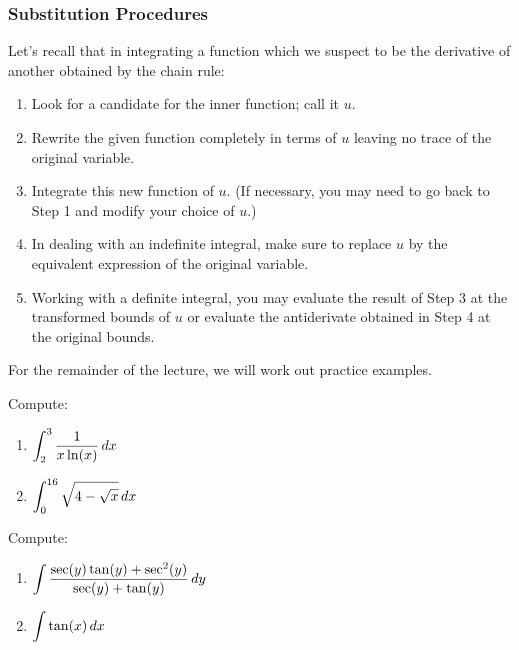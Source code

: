 \documentclass[10pt,t,handout,ignorenonframetext,aspectratio=169]{beamer}
\title[\course]{\lecTitle}
\institute[Ohio State]
{
  \medskip
}
\date[\week]{\semester}
\author{Tae Eun Kim, Ph.D.}
\begin{document}
\begin{frame}
  \titlepage
\end{frame}



\begin{frame}
  \frametitle{Substitution Procedures}
  Let's recall that in integrating a function which we suspect to be the
  derivative of another obtained by the chain rule:
  \begin{enumerate}
  \item Look for a candidate for the inner function; call it $u$.
  \item Rewrite the given function completely in terms of $u$ leaving
    no trace of the original variable.
  \item Integrate this new function of $u$. (If necessary, you may
    need to go back to Step 1 and modify your choice of $u$.)
  \item In dealing with an indefinite integral, make sure to replace
    $u$ by the equivalent expression of the original variable.
  \item Working with a definite integral, you may evaluate the result
    of Step 3 at the transformed bounds of $u$ or evaluate the
    antiderivate obtained in Step 4 at the original bounds.
  \end{enumerate}
  For the remainder of the lecture, we will work out practice examples.
\end{frame}

\begin{frame}
  \vs
  \begin{example}
    Compute:
    \begin{enumerate}
    \item $\displaystyle \int_{2}^{3} \frac{1}{x\ln(x)} \mathop{}\!d x$
    \item $\displaystyle \int_0^{16} \sqrt{4 - \sqrt{x}} \mathop{}\!d x$
    \end{enumerate}
  \end{example}
\end{frame}

\begin{frame}
  \vs
  \begin{example}
    Compute:
    \begin{enumerate}
    \item $\displaystyle \int \frac{\sec(y) \tan(y) + \sec^2(y)}{\sec(y) + \tan(y)} \mathop{}\!d y$
    \item $\displaystyle \int \tan(x) \mathop{}\!d x$
    \end{enumerate}
  \end{example}
\end{frame}
\end{document}
